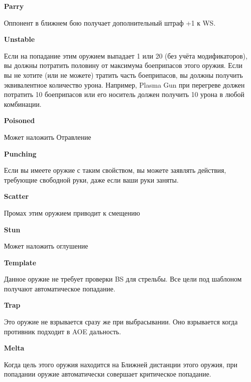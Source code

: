 \begin{multicols}{2}
\textbf{Parry}

Оппонент в ближнем бою получает дополнительный штраф +1 к WS.

\textbf{Unstable}

Если на попадание этим оружием выпадает 1 или 20 (без учёта модификаторов), вы должны потратить половину от максимума боеприпасов этого оружия.
Если вы не хотите (или не можете) тратить часть боеприпасов, вы должны получить эквивалентное количество урона.
Например, Plasma Gun при перегреве должен потратить 10 боеприпасов или его носитель должен получить 10 урона в любой комбинации.

\textbf{Poisoned}

Может наложить Отравление

\textbf{Punching}

Если вы имеете оружие с таким свойством, вы можете заявлять действия, требующие свободной руки, даже если ваши руки заняты.

\textbf{Scatter}

Промах этим оружием приводит к смещению

\textbf{Stun}

Может наложить оглушение

\textbf{Template}

Данное оружие не требует проверки BS для стрельбы. Все цели под шаблоном получают автоматическое попадание.

\textbf{Trap}

Это оружие не взрывается сразу же при выбрасывании. Оно взрывается когда противник подходит в AOE дальность.

\textbf{Melta}

Когда цель этого оружия находится на Ближней дистанции этого оружия, при попадании оружие автоматически совершает критическое попадание.

\end{multicols}


